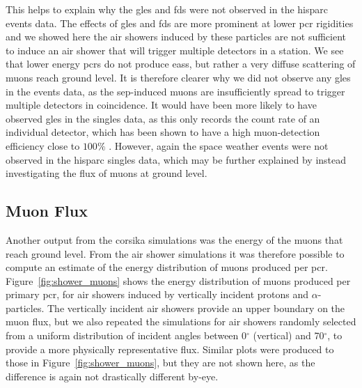 
This helps to explain why the \glspl{gle} and \glspl{fd} were not observed in the \gls{hisparc} events data. The effects of \glspl{gle} and \glspl{fd} are more prominent at lower \gls{pcr} rigidities \citep{belov_solar_2005} and we showed here the air showers induced by these particles are not sufficient to induce an air shower that will trigger multiple detectors in a station. We see that lower energy \glspl{pcr} do not produce \glspl{eas}, but rather a very diffuse scattering of muons reach ground level. It is therefore clearer why we did not observe any \glspl{gle} in the events data, as the \gls{sep}-induced muons are insufficiently spread to trigger multiple detectors in coincidence. It would have been more likely to have observed \glspl{gle} in the singles data, as this only records the count rate of an individual detector, which has been shown to have a high muon-detection efficiency close to $100\%$ \citep{van_dam_hisparc_2020}. However, again the space weather events were not observed in the \gls{hisparc} singles data, which may be further explained by instead investigating the flux of muons at ground level.



\subsection{Muon Flux}\label{sec:CORSIKA_flux}

Another output from the \gls{corsika} simulations was the energy of the muons that reach ground level. From the air shower simulations it was therefore possible to compute an estimate of the energy distribution of muons produced per \gls{pcr}. Figure~\ref{fig:shower_muons} shows the energy distribution of muons produced per primary \gls{pcr}, for air showers induced by vertically incident protons and $\alpha$-particles. The vertically incident air showers provide an upper boundary on the muon flux, but we also repeated the simulations for air showers randomly selected from a uniform distribution of incident angles between 0$^\circ$ (vertical) and 70$^\circ$, to provide a more physically representative flux. Similar plots were produced to those in Figure~\ref{fig:shower_muons}, but they are not shown here, as the difference is again not drastically different by-eye. 



